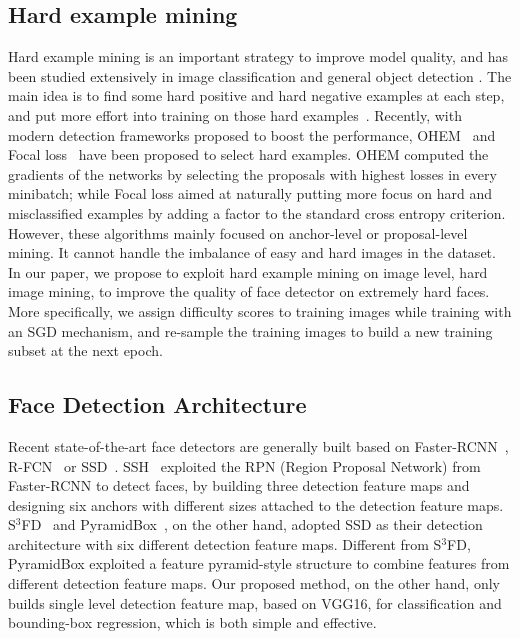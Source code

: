 \documentclass[10pt,twocolumn,letterpaper]{article}
\begin{document}
\subsection{Hard example mining}
Hard example mining is an important strategy to improve model quality, and
has been studied extensively in image classification \cite{loshchilov2015online} and general object detection \cite{lin2018focal,shrivastava2016training}. The main idea is to find some hard positive and
hard negative examples at each step, and put more effort into training on those hard
examples~\cite{rowley1998neural,viola2001rapid}. Recently, with modern detection
frameworks proposed to boost the performance, OHEM~\cite{shrivastava2016training} and Focal loss~\cite{lin2018focal} have been proposed to select hard examples. OHEM computed the gradients of the networks by
selecting the proposals with highest losses in every minibatch; while Focal loss aimed at naturally putting more focus on hard and
misclassified examples by adding a factor to the standard cross entropy criterion.
However, these algorithms mainly focused on anchor-level or proposal-level mining. It cannot handle the
imbalance of easy and hard images in the dataset.
In our paper, we propose to exploit hard
example mining on image level, \ie hard image mining, to improve the quality of face detector on extremely hard faces. More specifically,
we assign difficulty scores to training images while training with an SGD mechanism,
and re-sample the training images to build a new training subset at the next epoch.

\subsection{Face Detection Architecture}
Recent state-of-the-art face detectors are generally built based on Faster-RCNN~\cite{ren2015faster}, R-FCN~\cite{dai2016r} or SSD~\cite{liu2016ssd}.
SSH~\cite{najibi2017ssh} exploited the RPN (Region Proposal Network) from Faster-RCNN to detect faces, by
building three detection feature maps and designing six anchors with different
sizes attached to the detection feature maps. S$^{3}$FD~\cite{zhang2017s} and
PyramidBox~\cite{Tang_2018_ECCV}, on the other hand,
adopted SSD as their detection architecture with six different detection feature maps.
Different from S$^3$FD, PyramidBox exploited a feature pyramid-style structure
to combine features from different detection feature maps. Our proposed method, on the other
hand, only builds single level detection feature map, based on VGG16,
for classification and bounding-box regression, which is both simple and effective.
\end{document}

